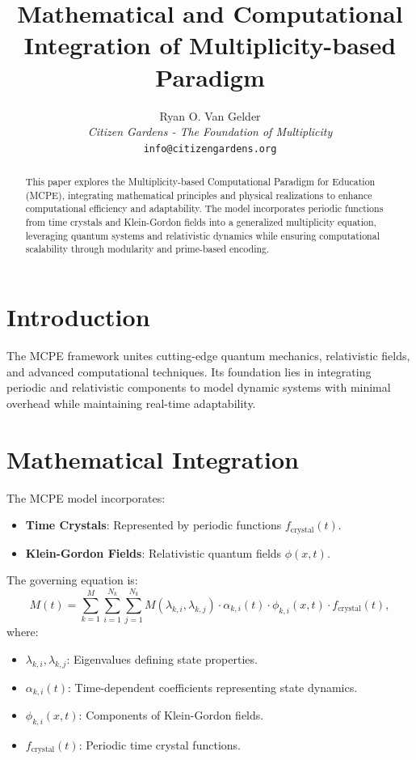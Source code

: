 \documentclass{article}
\title{Mathematical and Computational Integration of Multiplicity-based Paradigm}
\author{Ryan O. Van Gelder \\ \textit{Citizen Gardens - The Foundation of Multiplicity} \\ \texttt{info@citizengardens.org}}
\theoremstyle{plain}
\begin{document}
\maketitle

\begin{abstract}
This paper explores the Multiplicity-based Computational Paradigm for Education (MCPE), integrating mathematical principles and physical realizations to enhance computational efficiency and adaptability. The model incorporates periodic functions from time crystals and Klein-Gordon fields into a generalized multiplicity equation, leveraging quantum systems and relativistic dynamics while ensuring computational scalability through modularity and prime-based encoding.
\end{abstract}

\section{Introduction}
The MCPE framework unites cutting-edge quantum mechanics, relativistic fields, and advanced computational techniques. Its foundation lies in integrating periodic and relativistic components to model dynamic systems with minimal overhead while maintaining real-time adaptability.

\section{Mathematical Integration}
The MCPE model incorporates:
\begin{itemize}
    \item \textbf{Time Crystals}: Represented by periodic functions \( f_{\text{crystal}}(t) \).
    \item \textbf{Klein-Gordon Fields}: Relativistic quantum fields \( \phi(x, t) \).
\end{itemize}
The governing equation is:
\begin{equation}
M(t) = \sum_{k=1}^M \sum_{i=1}^{N_k} \sum_{j=1}^{N_k} M(\lambda_{k,i}, \lambda_{k,j}) \cdot \alpha_{k,i}(t) \cdot \phi_{k,i}(x,t) \cdot f_{\text{crystal}}(t),
\end{equation}
where:
\begin{itemize}
    \item \( \lambda_{k,i}, \lambda_{k,j} \): Eigenvalues defining state properties.
    \item \( \alpha_{k,i}(t) \): Time-dependent coefficients representing state dynamics.
    \item \( \phi_{k,i}(x,t) \): Components of Klein-Gordon fields.
    \item \( f_{\text{crystal}}(t) \): Periodic time crystal functions.
\end{itemize}
\end{document}
